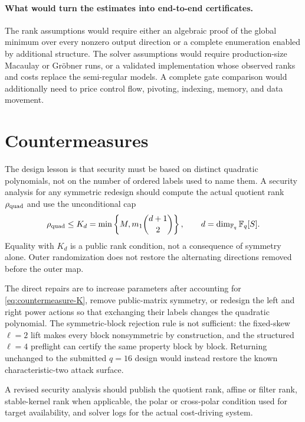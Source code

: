 \documentclass[11pt]{article}
\newcommand{\F}{\mathbb F}
\begin{document}
\paragraph{What would turn the estimates into end-to-end certificates.}
The rank assumptions would require either an algebraic proof of the global
minimum over every nonzero output direction or a complete enumeration enabled
by additional structure.  The solver assumptions would require
production-size Macaulay or Gr\"obner runs, or a validated implementation
whose observed ranks and costs replace the semi-regular models.  A complete
gate comparison would additionally need to price control flow, pivoting,
indexing, memory, and data movement.

\section{Countermeasures}\label{sec:countermeasures}

The design lesson is that security must be based on distinct quadratic
polynomials, not on the number of ordered labels used to name them.  A security
analysis for any symmetric redesign should compute the actual quotient rank
$\rho_{\rm quad}$ and use the unconditional cap
\begin{equation}\label{eq:countermeasure-K}
 \rho_{\rm quad}\le K_d
 =\min\left\{M,m_1\binom{d+1}{2}\right\},
 \qquad d=\dim_{\F_q}\F_q[S].
\end{equation}
Equality with $K_d$ is a public rank condition, not a consequence of symmetry
alone.  Outer randomization does not restore the alternating directions removed
before the outer map.

The direct repairs are to increase parameters after accounting for
\eqref{eq:countermeasure-K},
remove public-matrix symmetry, or redesign the left and right power actions so
that exchanging their labels changes the quadratic polynomial.  The
symmetric-block rejection rule is not sufficient: the fixed-skew $\ell=2$
lift makes every block nonsymmetric by construction, and the structured
$\ell=4$ preflight can certify the same property block by block.  Returning
unchanged to the submitted $q=16$ design would instead restore the known
characteristic-two attack surface.

A revised security analysis should publish the quotient rank, affine or filter
rank, stable-kernel rank when applicable, the polar or cross-polar condition
used for target availability, and solver logs for the actual cost-driving
system.
\end{document}
